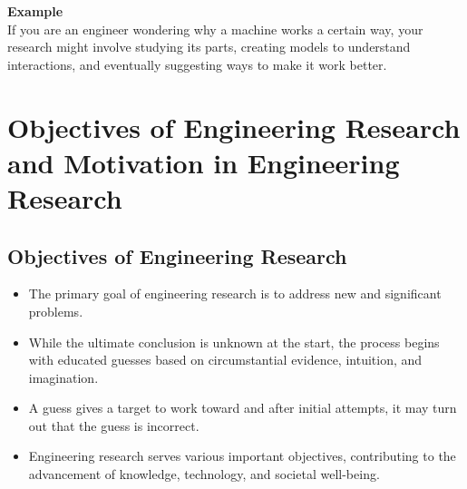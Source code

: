 \documentclass{article}
\begin{document}
	\noindent \textbf{Example} \\
	If you are an engineer wondering why a machine works a certain way, your research might involve studying
	its parts, creating models to understand interactions, and eventually suggesting ways to make it work
	better.

	\section{Objectives of Engineering Research and Motivation in Engineering Research}
	\subsection{Objectives of Engineering Research}
	\begin{itemize}
		\item The primary goal of engineering research is to address new and significant problems.
		\item While the ultimate conclusion is unknown at the start, the process begins with educated guesses
			based on circumstantial evidence, intuition, and imagination.
		\item A guess gives a target to work toward and after initial attempts, it may turn out that the guess
			is incorrect.
		\item Engineering research serves various important objectives, contributing to the advancement of
			knowledge, technology, and societal well-being.
	\end{itemize}
\end{document}

